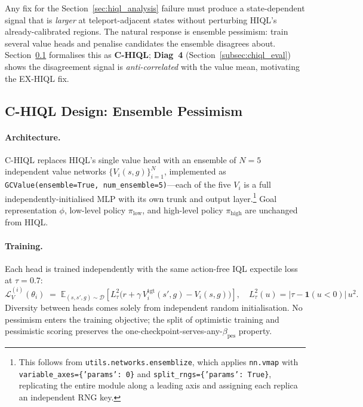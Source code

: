 \documentclass[11pt]{article}
\begin{document}
Any fix for the Section~\ref{sec:hiql_analysis} failure must produce a
state-dependent signal that is \emph{larger} at teleport-adjacent states
without perturbing HIQL's already-calibrated regions.
The natural response is ensemble pessimism: train several value heads
and penalise candidates the ensemble disagrees about.
Section~\ref{subsec:chiql_design} formalises this as \textbf{C-HIQL}; \textbf{Diag~4}
(Section~\ref{subsec:chiql_eval}) shows the disagreement signal is
\emph{anti-correlated} with the value mean, motivating the EX-HIQL fix.

\subsection{C-HIQL Design: Ensemble Pessimism}
\label{subsec:chiql_design}

\paragraph{Architecture.}
C-HIQL replaces HIQL's single value head with an ensemble of $N=5$ independent
value networks $\{V_i(s,g)\}_{i=1}^{N}$, implemented as
\texttt{GCValue(ensemble=True, num\_ensemble=5)}---each of the five $V_i$ is a
full independently-initialised MLP with its own trunk and output layer.\footnote{%
This follows from \texttt{utils.networks.ensemblize}, which applies
\texttt{nn.vmap} with \texttt{variable\_axes=\{'params': 0\}} and
\texttt{split\_rngs=\{'params': True\}}, replicating the entire module along a
leading axis and assigning each replica an independent RNG key.}
Goal representation $\phi$, low-level policy $\pi_\text{low}$, and high-level
policy $\pi_\text{high}$ are unchanged from HIQL.

\paragraph{Training.}
Each head is trained independently with the same action-free IQL expectile
loss at $\tau = 0.7$:
\begin{equation}
  \mathcal{L}_V^{(i)}(\theta_i) \;=\;
  \mathbb{E}_{(s,s',g) \sim \mathcal{D}}\!\left[
    L_\tau^2\!\big(r + \gamma\,V_i^{\text{tgt}}(s',g) - V_i(s,g)\big)
  \right],
  \quad L_\tau^2(u) = |\tau - \mathbf{1}(u<0)|\,u^2.
\end{equation}
Diversity between heads comes solely from independent random initialisation.
No pessimism enters the training objective; the split of optimistic
training and pessimistic scoring preserves the
one-checkpoint-serves-any-$\beta_\text{pes}$ property.
\end{document}
